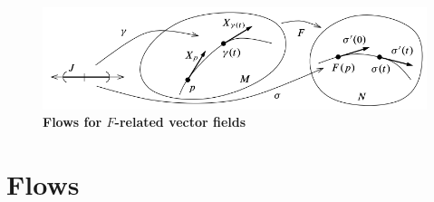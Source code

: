 \documentclass[11pt]{article}
\begin{document}
\begin{figure}
\begin{minipage}[htb]{1\linewidth}
  \centering
  \centerline{\includegraphics[scale = 0.45]{Flows_F_related_vector_fields.png}}
\end{minipage}
\caption{\footnotesize{\textbf{Flows for $F$-related vector fields \citep{lee2003introduction}}}}
\label{fig: Flows_F_related_vector_fields}
\end{figure}
\section{Flows}
\end{document}

